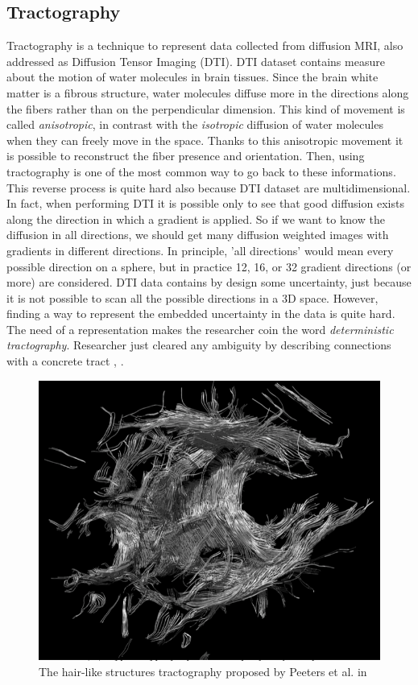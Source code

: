 \documentclass{article}
\begin{document}
\begin{multicols}{2}
\subsection{Tractography}
\label{subsec:tractography}
Tractography is a technique to represent data collected from diffusion MRI, also addressed as Diffusion Tensor Imaging (DTI). DTI dataset contains measure about the motion of water molecules in brain tissues. Since the brain white matter is a fibrous structure, water molecules diffuse more in the directions along the fibers rather than on the perpendicular dimension. This kind of movement is called \textit{anisotropic}, in contrast with the \textit{isotropic} diffusion of water molecules when they can freely move in the space. Thanks to this anisotropic movement it is possible to reconstruct the fiber presence and orientation. Then, using tractography is one of the most common way to go back to these informations. This reverse process is quite hard also because DTI dataset are multidimensional. In fact, when performing DTI it is possible only to see that good diffusion exists along the direction in which a gradient is applied. So if we want to know the diffusion in all directions, we should get many diffusion weighted images with gradients in different directions. In principle, 'all directions' would mean every possible direction on a sphere, but in practice 12, 16, or 32 gradient directions (or more) are considered. DTI data contains by design some uncertainty, just because it is not possible to scan all the possible directions in a 3D space. However, finding a way to represent the embedded uncertainty in the data is quite hard. The need of a representation makes the researcher coin the word \textit{deterministic tractography}. Researcher just cleared any ambiguity by describing connections with a concrete tract \cite{conturo1999tracking}, \cite{mori1999three}. 

\begin{figure}[H]
\centering
\includegraphics[width = 0.8\columnwidth]{hairLike}
\caption{The hair-like structures tractography proposed by Peeters et al. in \cite{peeters2006visualization}}
\label{fig:hairlike}
\end{figure}


\end{multicols}
\end{document}
